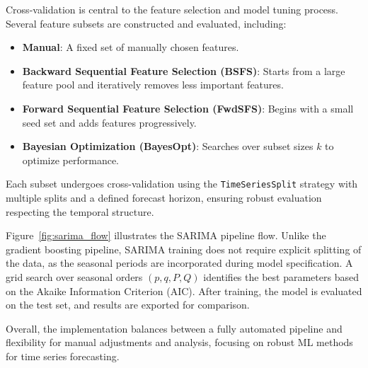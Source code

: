 Cross-validation is central to the feature selection and model tuning process. Several feature subsets are 
constructed and evaluated, including:

\begin{itemize}
    \item \textbf{Manual}: A fixed set of manually chosen features.
    \item \textbf{Backward Sequential Feature Selection (BSFS)}: Starts from a large feature pool and iteratively removes less important features.
    \item \textbf{Forward Sequential Feature Selection (FwdSFS)}: Begins with a small seed set and adds features progressively.
    \item \textbf{Bayesian Optimization (BayesOpt)}: Searches over subset sizes $k$ to optimize performance.
\end{itemize}

Each subset undergoes cross-validation using the \texttt{TimeSeriesSplit} strategy with multiple splits and a defined 
forecast horizon, ensuring robust evaluation respecting the temporal structure.

Figure~\ref{fig:sarima_flow} illustrates the SARIMA pipeline flow. Unlike the gradient boosting pipeline, SARIMA 
training does not require explicit splitting of the data, as the seasonal periods are incorporated during model 
specification. A grid search over seasonal orders $(p,q,P,Q)$ identifies the best parameters based on the Akaike 
Information Criterion (AIC). After training, the model is evaluated on the test set, and results are exported for 
comparison.

Overall, the implementation balances between a fully automated pipeline and flexibility for manual adjustments and 
analysis, focusing on robust ML methods for time series forecasting.























